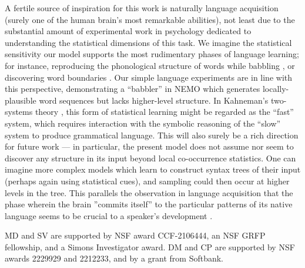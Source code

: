 \documentclass{article}
\theoremstyle{remark}
\newcommand{\1}{\mathbbm{1}}
\begin{document}
A fertile source of inspiration for this work is naturally language acquisition (surely one of the human brain's most remarkable abilities), not least due to the substantial amount of experimental work in psychology dedicated to understanding the statistical dimensions of this task. We imagine the statistical sensitivity our model supports the most rudimentary phases of language learning; for instance, reproducing the phonological structure of words while babbling \cite{boyssonbardies1991adaptation}, or discovering word boundaries \cite{saffran1996statistical}. Our simple language experiments are in line with this perspective, demonstrating a ``babbler'' in NEMO which generates locally-plausible word sequences but lacks higher-level structure. In Kahneman's two-systems theory \cite{kahneman2011thinking}, this form of statistical learning might be regarded as the ``fast'' system, which requires interaction with the symbolic reasoning of the ``slow'' system to produce grammatical language. This will also surely be a rich direction for future work --- in particular, the present model does not assume nor seem to discover any structure in its input beyond local co-occurrence statistics. One can imagine more complex models which learn to construct syntax trees of their input (perhaps again using statistical cues), and sampling could then occur at higher levels in the tree. This parallels the observation in language acquisition that the phase wherein the brain ''commits itself'' to the particular patterns of its native language seems to be crucial to a speaker's development \cite{kuhl2004early}.

\begin{ack}
MD and SV are supported by NSF award CCF-2106444, an NSF GRFP fellowship, and a Simons Investigator award. DM and CP are supported by NSF awards 2229929 and 2212233, and by a grant from Softbank.
\end{ack}

{
\small
% 
\printbibliography

}
\end{document}
